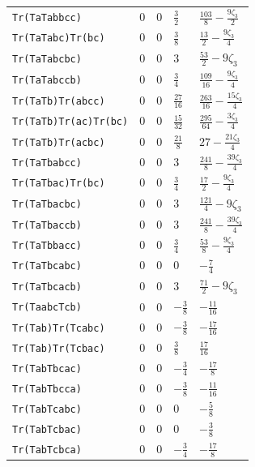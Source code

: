 \begin{center}
\begin{longtable}{lllll}
\texttt{Tr(TaTabbcc)} & $0$ & $0$ & $\frac{3}{2}$ & $\frac{103}{8} - \frac{9 \zeta_3}{2}$\\
\texttt{Tr(TaTabc)Tr(bc)} & $0$ & $0$ & $\frac{3}{8}$ & $\frac{13}{2} - \frac{9 \zeta_3}{4}$\\
\texttt{Tr(TaTabcbc)} & $0$ & $0$ & $3$ & $\frac{53}{2} - 9 \zeta_3$\\
\texttt{Tr(TaTabccb)} & $0$ & $0$ & $\frac{3}{4}$ & $\frac{109}{16} - \frac{9 \zeta_3}{4}$\\
\texttt{Tr(TaTb)Tr(abcc)} & $0$ & $0$ & $\frac{27}{16}$ & $\frac{263}{16} - \frac{15 \zeta_3}{4}$\\
\texttt{Tr(TaTb)Tr(ac)Tr(bc)} & $0$ & $0$ & $\frac{15}{32}$ & $\frac{295}{64} - \frac{3 \zeta_3}{4}$\\
\texttt{Tr(TaTb)Tr(acbc)} & $0$ & $0$ & $\frac{21}{8}$ & $27 - \frac{21 \zeta_3}{4}$\\
\texttt{Tr(TaTbabcc)} & $0$ & $0$ & $3$ & $\frac{241}{8} - \frac{39 \zeta_3}{4}$\\
\texttt{Tr(TaTbac)Tr(bc)} & $0$ & $0$ & $\frac{3}{4}$ & $\frac{17}{2} - \frac{9 \zeta_3}{4}$\\
\texttt{Tr(TaTbacbc)} & $0$ & $0$ & $3$ & $\frac{121}{4} - 9 \zeta_3$\\
\texttt{Tr(TaTbaccb)} & $0$ & $0$ & $3$ & $\frac{241}{8} - \frac{39 \zeta_3}{4}$\\
\texttt{Tr(TaTbbacc)} & $0$ & $0$ & $\frac{3}{4}$ & $\frac{53}{8} - \frac{9 \zeta_3}{4}$\\
\texttt{Tr(TaTbcabc)} & $0$ & $0$ & $0$ & $- \frac{7}{4}$\\
\texttt{Tr(TaTbcacb)} & $0$ & $0$ & $3$ & $\frac{71}{2} - 9 \zeta_3$\\
\texttt{Tr(TaabcTcb)} & $0$ & $0$ & $- \frac{3}{8}$ & $- \frac{11}{16}$\\
\texttt{Tr(Tab)Tr(Tcabc)} & $0$ & $0$ & $- \frac{3}{8}$ & $- \frac{17}{16}$\\
\texttt{Tr(Tab)Tr(Tcbac)} & $0$ & $0$ & $\frac{3}{8}$ & $\frac{17}{16}$\\
\texttt{Tr(TabTbcac)} & $0$ & $0$ & $- \frac{3}{4}$ & $- \frac{17}{8}$\\
\texttt{Tr(TabTbcca)} & $0$ & $0$ & $- \frac{3}{8}$ & $- \frac{11}{16}$\\
\texttt{Tr(TabTcabc)} & $0$ & $0$ & $0$ & $- \frac{5}{8}$\\
\texttt{Tr(TabTcbac)} & $0$ & $0$ & $0$ & $- \frac{3}{8}$\\
\texttt{Tr(TabTcbca)} & $0$ & $0$ & $- \frac{3}{4}$ & $- \frac{17}{8}$\\

\end{longtable}
\end{center}

